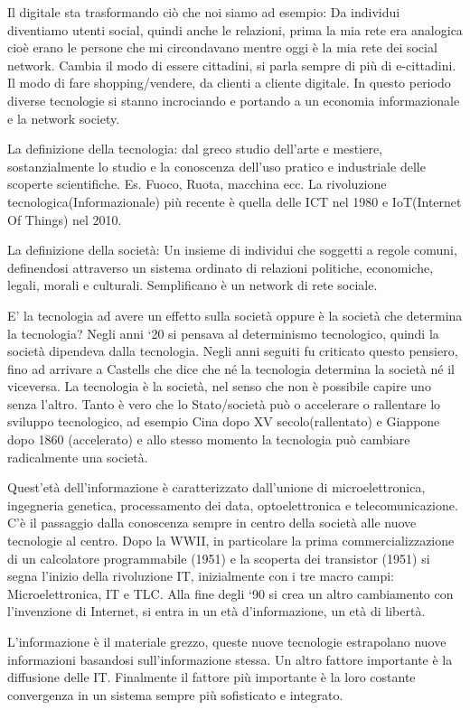 \documentclass[a4page, 11pt]{article}
\begin{document}
Il digitale sta trasformando ciò che noi siamo ad esempio: Da individui
diventiamo utenti social, quindi anche le relazioni, prima la mia rete
era analogica cioè erano le persone che mi circondavano mentre oggi è la
mia rete dei social network. Cambia il modo di essere cittadini, si
parla sempre di più di e-cittadini. Il modo di fare shopping/vendere, da
clienti a cliente digitale. In questo periodo diverse tecnologie si
stanno incrociando e portando a un economia informazionale e la network
society.

La definizione della tecnologia: dal greco studio dell'arte e mestiere,
sostanzialmente lo studio e la conoscenza dell'uso pratico e industriale
delle scoperte scientifiche. Es. Fuoco, Ruota, macchina ecc. La
rivoluzione tecnologica(Informazionale) più recente è quella delle ICT
nel 1980 e IoT(Internet Of Things) nel 2010.

La definizione della società: Un insieme di individui che soggetti a
regole comuni, definendosi attraverso un sistema ordinato di relazioni
politiche, economiche, legali, morali e culturali. Semplificano è un
network di rete sociale.

E' la tecnologia ad avere un effetto sulla società oppure è la società
che determina la tecnologia? Negli anni `20 si pensava al determinismo
tecnologico, quindi la società dipendeva dalla tecnologia. Negli anni
seguiti fu criticato questo pensiero, fino ad arrivare a Castells che
dice che né la tecnologia determina la società né il viceversa. La
tecnologia è la società, nel senso che non è possibile capire uno senza
l'altro. Tanto è vero che lo Stato/società può o accelerare o rallentare
lo sviluppo tecnologico, ad esempio Cina dopo XV secolo(rallentato) e
Giappone dopo 1860 (accelerato) e allo stesso momento la tecnologia può
cambiare radicalmente una società.

Quest'età dell'informazione è caratterizzato dall'unione di
microelettronica, ingegneria genetica, processamento dei data,
optoelettronica e telecomunicazione. C'è il passaggio dalla conoscenza
sempre in centro della società alle nuove tecnologie al centro. Dopo la
WWII, in particolare la prima commercializzazione di un calcolatore
programmabile (1951) e la scoperta dei transistor (1951) si segna
l'inizio della rivoluzione IT, inizialmente con i tre macro campi:
Microelettronica, IT e TLC. Alla fine degli `90 si crea un altro
cambiamento con l'invenzione di Internet, si entra in un età
d'informazione, un età di libertà.

L'informazione è il materiale grezzo, queste nuove tecnologie
estrapolano nuove informazioni basandosi sull'informazione stessa. Un
altro fattore importante è la diffusione delle IT. Finalmente il fattore
più importante è la loro costante convergenza in un sistema sempre più
sofisticato e integrato.
\end{document}
